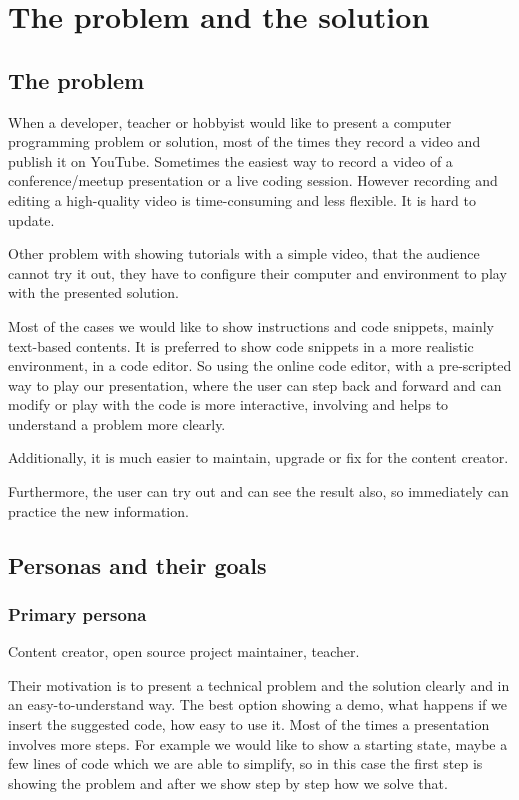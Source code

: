\chapter{The problem and the solution}

\section{The problem}

When a developer, teacher or hobbyist would like to present a computer programming problem or solution, most of the times they record a video and publish it on YouTube. Sometimes the easiest way to record a video of a conference/meetup presentation or a live coding session. However recording and editing a high-quality video is time-consuming and less flexible. It is hard to update.

Other problem with showing tutorials with a simple video, that the audience cannot try it out, they have to configure their computer and environment to play with the presented solution.

Most of the cases we would like to show instructions and code snippets, mainly text-based contents. It is preferred to show code snippets in a more realistic environment, in a code editor. So using the online code editor, with a pre-scripted way to play our presentation, where the user can step back and forward and can modify or play with the code is more interactive, involving and helps to understand a problem more clearly.

Additionally, it is much easier to maintain, upgrade or fix for the content creator.

Furthermore, the user can try out and can see the result also, so immediately can practice the new information.

\section{Personas and their goals}

\subsection{Primary persona}

Content creator, open source project maintainer, teacher.

Their motivation is to present a technical problem and the solution clearly and in an easy-to-understand way. The best option showing a demo, what happens if we insert the suggested code, how easy to use it. Most of the times a presentation involves more steps. For example we would like to show a starting state, maybe a few lines of code which we are able to simplify, so in this case the first step is showing the problem and after we show step by step how we solve that.

